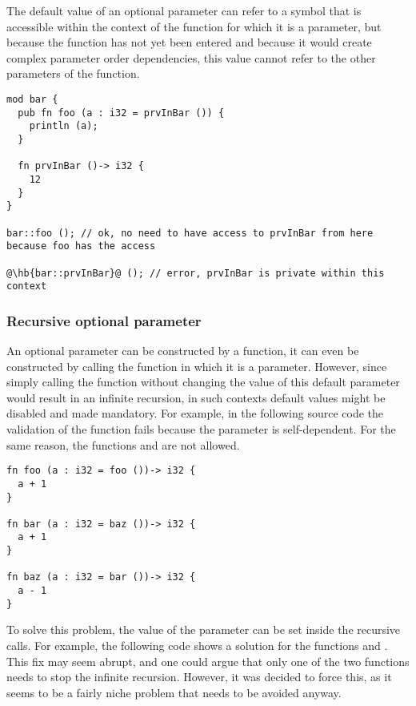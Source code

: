 The default value of an optional parameter can refer to a symbol that is
accessible within the context of the function for which it is a parameter, but
because the function has not yet been entered and because it would create
complex parameter order dependencies, this value cannot refer to the other
parameters of the function.

\begin{lstlisting}[style=coloredverbatim, escapechar=@]
mod bar {
  pub fn foo (a : i32 = prvInBar ()) {
    println (a);
  }

  fn prvInBar ()-> i32 {
    12
  }
}

bar::foo (); // ok, no need to have access to prvInBar from here because foo has the access

@\hb{bar::prvInBar}@ (); // error, prvInBar is private within this context
\end{lstlisting}

\subsubsection{Recursive optional parameter}

An optional parameter can be constructed by a function, it can even be
constructed by calling the function in which it is a parameter. However, since
simply calling the function without changing the value of this default parameter
would result in an infinite recursion, in such contexts default values might be
disabled and made mandatory. For example, in the following source code the
validation of the function  fails because the parameter 
is self-dependent. For the same reason, the functions  and
 are not allowed.

\begin{lstlisting}[style=coloredverbatim]
fn foo (a : i32 = foo ())-> i32 {
  a + 1
}

fn bar (a : i32 = baz ())-> i32 {
  a + 1
}

fn baz (a : i32 = bar ())-> i32 {
  a - 1
}
\end{lstlisting}

To solve this problem, the value of the parameter  can be set inside
the recursive calls. For example, the following code shows a solution for the
functions  and . This fix may seem abrupt, and one could
argue that only one of the two functions needs to stop the infinite recursion.
However, it was decided to force this, as it seems to be a fairly niche problem
that needs to be avoided anyway.

